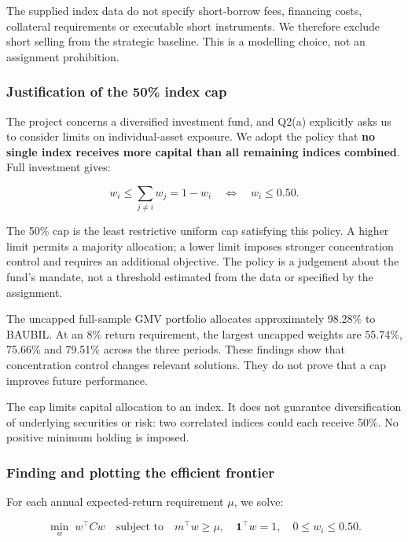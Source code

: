 \documentclass[
  10pt,
  a4paper,
]{article}
\begin{document}
The supplied index data do not specify short-borrow fees, financing
costs, collateral requirements or executable short instruments. We
therefore exclude short selling from the strategic baseline. This is a
modelling choice, not an assignment prohibition.

\hypertarget{justification-of-the-50-index-cap}{%
\subsubsection{Justification of the 50\% index
cap}\label{justification-of-the-50-index-cap}}

The project concerns a diversified investment fund, and Q2(a) explicitly
asks us to consider limits on individual-asset exposure. We adopt the
policy that \textbf{no single index receives more capital than all
remaining indices combined}. Full investment gives:

\[
w_i\leq\sum_{j\ne i}w_j=1-w_i
\quad\Longleftrightarrow\quad w_i\leq0.50.
\]

The 50\% cap is the least restrictive uniform cap satisfying this
policy. A higher limit permits a majority allocation; a lower limit
imposes stronger concentration control and requires an additional
objective. The policy is a judgement about the fund's mandate, not a
threshold estimated from the data or specified by the assignment.

The uncapped full-sample GMV portfolio allocates approximately 98.28\%
to BAUBIL. At an 8\% return requirement, the largest uncapped weights
are 55.74\%, 75.66\% and 79.51\% across the three periods. These
findings show that concentration control changes relevant solutions.
They do not prove that a cap improves future performance.

The cap limits capital allocation to an index. It does not guarantee
diversification of underlying securities or risk: two correlated indices
could each receive 50\%. No positive minimum holding is imposed.

\newpage

\hypertarget{finding-and-plotting-the-efficient-frontier}{%
\subsubsection{Finding and plotting the efficient
frontier}\label{finding-and-plotting-the-efficient-frontier}}

For each annual expected-return requirement \(\mu\), we solve:

\[
\min_w\;w^\top Cw
\quad\text{subject to}\quad
m^\top w\geq\mu,\quad\mathbf1^\top w=1,\quad0\leq w_i\leq0.50.
\]
\end{document}
